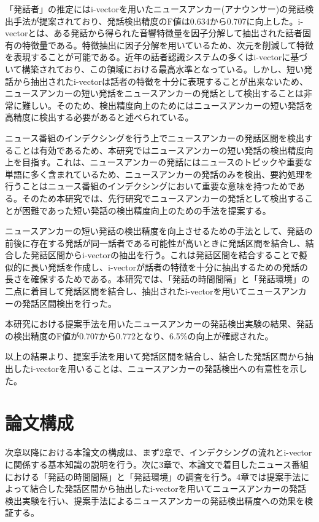 「発話者」の推定にはi-vectorを用いたニュースアンカー(アナウンサー)の発話検出手法\cite{nozaki_gakuseikai}が提案されており、発話検出精度のF値は0.634から0.707に向上した。i-vectorとは、ある発話から得られた音響特徴量を因子分解して抽出された話者固有の特徴量である。特徴抽出に因子分解を用いているため、次元を削減して特徴を表現することが可能である。近年の話者認識システムの多くはi-vectorに基づいて構築されており、この領域における最高水準となっている。しかし、短い発話から抽出されたi-vectorは話者の特徴を十分に表現することが出来ないため\cite{panaiv}、ニュースアンカーの短い発話をニュースアンカーの発話として検出することは非常に難しい。そのため、検出精度向上のためにはニュースアンカーの短い発話を高精度に検出する必要があると述べられている。\par

ニュース番組のインデクシングを行う上でニュースアンカーの発話区間を検出することは有効であるため、本研究ではニュースアンカーの短い発話の検出精度向上を目指す。これは、ニュースアンカーの発話にはニュースのトピックや重要な単語に多く含まれているため、ニュースアンカーの発話のみを検出、要約処理を行うことはニュース番組のインデクシングにおいて重要な意味を持つためである。そのため本研究では、先行研究でニュースアンカーの発話として検出することが困難であった短い発話の検出精度向上のための手法を提案する。\par

ニュースアンカーの短い発話の検出精度を向上させるための手法として、発話の前後に存在する発話が同一話者である可能性が高いときに発話区間を結合し、結合した発話区間からi-vectorの抽出を行う。これは発話区間を結合することで擬似的に長い発話を作成し、i-vectorが話者の特徴を十分に抽出するための発話の長さを確保するためである。本研究では、「発話の時間間隔」と「発話環境」の二点に着目して発話区間を結合し、抽出されたi-vectorを用いてニュースアンカーの発話区間検出を行った。\par

本研究における提案手法を用いたニュースアンカーの発話検出実験の結果、発話の検出精度のF値が0.707から0.772となり、6.5\%の向上が確認された。\par

以上の結果より、提案手法を用いて発話区間を結合し、結合した発話区間から抽出したi-vectorを用いることは、ニュースアンカーの発話検出への有意性を示した。

\section{論文構成}
次章以降における本論文の構成は、まず2章で、インデクシングの流れとi-vectorに関係する基本知識の説明を行う。次に3章で、本論文で着目したニュース番組における「発話の時間間隔」と「発話環境」の調査を行う。4章では提案手法によって結合した発話区間から抽出したi-vectorを用いてニュースアンカーの発話検出実験を行い、提案手法によるニュースアンカーの発話検出精度への効果を検証する。

